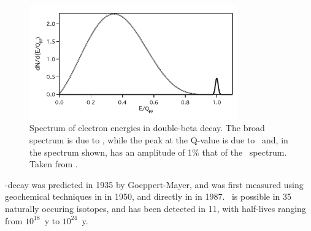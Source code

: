 \documentclass[/main.tex]{subfiles}
\begin{document}
\begin{figure}[t]
  \centering
  \includegraphics[width=0.8\textwidth]{bbSpectrum}
  \caption[Energy Spectrum of \tnbb\ and \znbb]{\label{fig:bbspectrum}
    Spectrum of electron energies in double-beta decay. The broad spectrum is due to \tnbb, while the peak at the Q-value is due to \znbb\ and, in the spectrum shown, has an amplitude of 1\% that of the \tnbb\ spectrum. Taken from \cite{Avignone2008}.
  }
\end{figure}
\bb -decay was predicted in 1935 by Goeppert-Mayer\cite{GoeppertMayer1935}, and was first measured using geochemical techniques in  in 1950\cite{Inghram1950}, and directly in  in 1987\cite{Elliott1987}.
\tnbb\ is possible in 35 naturally occuring isotopes, and has been detected in 11, with half-lives ranging from $10^{18}$~y to $10^{24}$~y\cite{Saakyan2013}.
\end{document}
